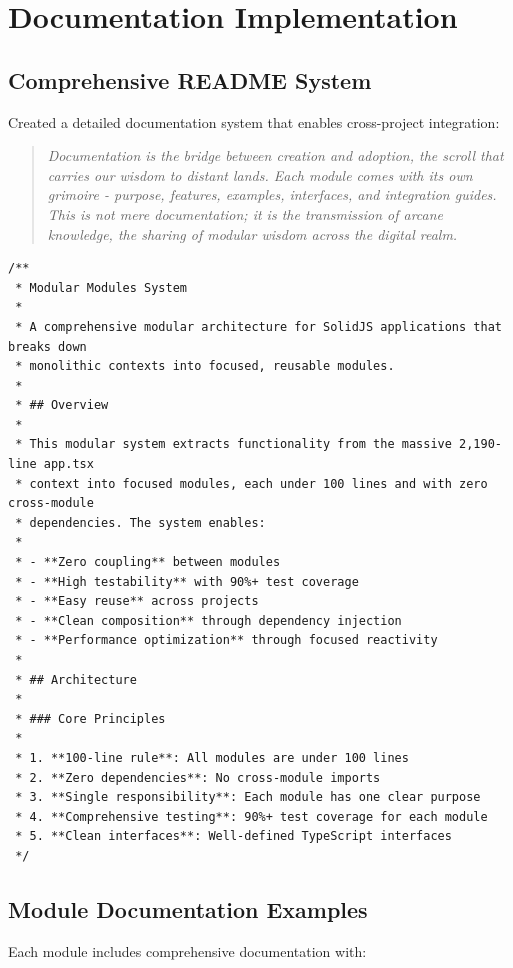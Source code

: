 \documentclass[11pt]{article}
\begin{document}
\section{Documentation Implementation}

\subsection{Comprehensive README System}

Created a detailed documentation system that enables cross-project integration:

\begin{quote}
\emph{Documentation is the bridge between creation and adoption, the scroll that carries our wisdom to distant lands. Each module comes with its own grimoire - purpose, features, examples, interfaces, and integration guides. This is not mere documentation; it is the transmission of arcane knowledge, the sharing of modular wisdom across the digital realm.}
\end{quote}

\begin{lstlisting}[style=typescript]
/**
 * Modular Modules System
 * 
 * A comprehensive modular architecture for SolidJS applications that breaks down 
 * monolithic contexts into focused, reusable modules.
 * 
 * ## Overview
 * 
 * This modular system extracts functionality from the massive 2,190-line app.tsx 
 * context into focused modules, each under 100 lines and with zero cross-module 
 * dependencies. The system enables:
 * 
 * - **Zero coupling** between modules
 * - **High testability** with 90%+ test coverage
 * - **Easy reuse** across projects
 * - **Clean composition** through dependency injection
 * - **Performance optimization** through focused reactivity
 * 
 * ## Architecture
 * 
 * ### Core Principles
 * 
 * 1. **100-line rule**: All modules are under 100 lines
 * 2. **Zero dependencies**: No cross-module imports
 * 3. **Single responsibility**: Each module has one clear purpose
 * 4. **Comprehensive testing**: 90%+ test coverage for each module
 * 5. **Clean interfaces**: Well-defined TypeScript interfaces
 */
\end{lstlisting}

\subsection{Module Documentation Examples}

Each module includes comprehensive documentation with:
\end{document}
